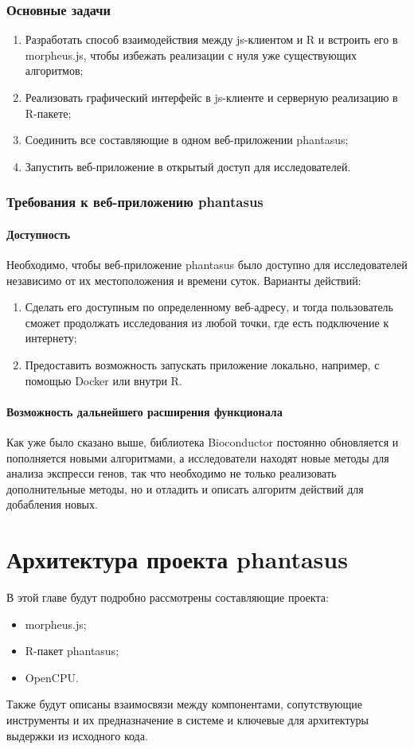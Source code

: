 \documentclass[specification,annotation]{itmo-student-thesis}
\begin{document}
\subsection{Основные задачи}
\begin{enumerate}
\item Разработать способ взаимодействия между js-клиентом и R и встроить его в morpheus.js, чтобы избежать реализации с нуля уже существующих алгоритмов;
\item Реализовать графический интерфейс в js-клиенте и серверную реализацию в R-пакете;
\item Соединить все составляющие в одном веб-приложении phantasus;
\item Запустить веб-приложение в открытый доступ для исследователей.
\end{enumerate}

\subsection{Требования к веб-приложению phantasus}
\subsubsection{Доступность}
Необходимо, чтобы веб-приложение phantasus было доступно для исследователей независимо от их местоположения и времени суток. Варианты действий:

\begin{enumerate}
\item Сделать его доступным по определенному веб-адресу, и тогда пользователь сможет продолжать исследования из любой точки, где есть подключение к интернету;
\item Предоставить возможность запускать приложение локально, например, с помощью Docker или внутри R.
\end{enumerate}

\subsubsection{Возможность дальнейшего расширения функционала}
Как уже было сказано выше, библиотека Bioconductor постоянно обновляется и пополняется новыми алгоритмами, а исследователи находят новые методы для анализа экспресси генов, так что необходимо не только реализовать дополнительные методы, но и отладить и описать алгоритм действий для добабления новых.

\chapterconclusion

\chapter{Архитектура проекта phantasus}
В этой главе будут подробно рассмотрены составляющие проекта:
\begin{itemize}
\item morpheus.js;
\item R-пакет phantasus;
\item OpenCPU.
\end{itemize}
Также будут описаны взаимосвязи между компонентами, сопутствующие инструменты и их предназначение в системе и ключевые для архитектуры выдержки из исходного кода.
\end{document}
